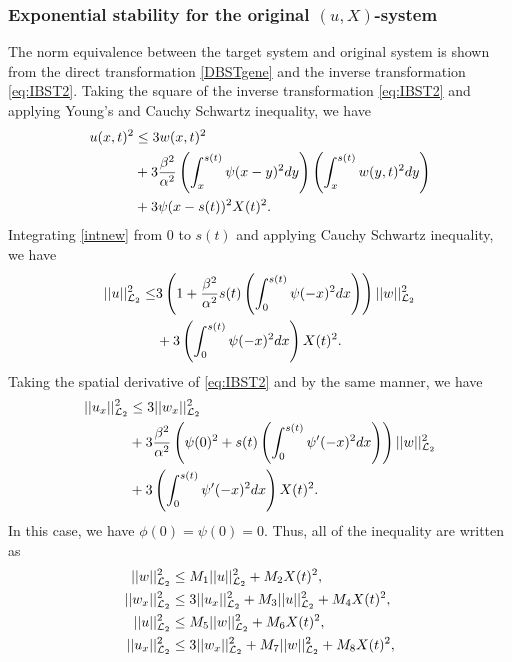 \documentclass[journal]{IEEEtran}
\begin{document}
\subsubsection{Exponential stability for the original $(u, X)$-system}\label{stabilityoriginal}
The norm equivalence between the target system and original system is shown from the direct transformation \eqref{DBSTgene} and the inverse transformation \eqref{eq:IBST2}. Taking the square of the inverse transformation \eqref{eq:IBST2} and applying Young's and Cauchy Schwartz inequality, we have
\begin{align}\label{intnew}
u(x,t)^2 &\leq  3 w(x,t)^2 \notag\\
&+ 3\frac{\beta^2}{\alpha^2} \left( \int_x^{s(t)} \psi(x-y)^2 dy\right) \left( \int_x^{s(t)} w(y,t)^2 dy\right)\notag\\
&+ 3 \psi(x-s(t))^2 X(t)^2.
\end{align}
Integrating \eqref{intnew} from $0$ to $s(t)$ and applying Cauchy Schwartz inequality, we have
\begin{align}\label{app-u-1}
|| u||_{{\cal L}_2}^2  \leq&  3\left(1+\frac{\beta^2}{\alpha^2} s(t) \left( \int_{0}^{s(t)} \psi(-x)^2 dx\right)\right) ||  w ||_{{\cal L}_2}^2 \notag\\
&+ 3 \left( \int_{0}^{s(t)} \psi(-x)^2 dx \right) X(t)^2.
\end{align}
Taking the spatial derivative of \eqref{eq:IBST2} and by the same manner, we have 
\begin{align}
|| u_{x} ||_{{\cal L}_2}^2 &\leq 3 || w_{x} ||_{{\cal L}_2}^2\notag\\
&+  3\frac{\beta^2}{\alpha^2}  \left(\psi(0)^2+s(t) \left( \int_{0}^{s(t)} \psi'(-x)^2 dx\right)\right) || w ||_{{\cal L}_2}^2 \notag\\
&+ 3 \left( \int_{0}^{s(t)} \psi'(-x)^2 dx \right) X(t)^2. 
\end{align}
In this case, we have $\phi(0) = \psi(0) = 0$. Thus, all of the inequality are written as
\begin{align}\label{bound1}
||w||_{{\cal L}_2}^2 &\leq  M_1 ||u||_{{\cal L}_2}^2 +M_2 X(t)^2,\\
\label{bound2}||w_{x}||_{{\cal L}_2}^2 &\leq 3  ||u_{x}||_{{\cal L}_2}^2+ M_3 ||u||_{{\cal L}_2}^2 + M_4X(t)^2,\\
\label{bound3}||u||_{{\cal L}_2}^2  &\leq  M_5 ||w||_{{\cal L}_2}^2 + M_6 X(t)^2,\\
\label{bound4}||u_{x}||_{{\cal L}_2}^2 &\leq 3  ||w_{x}||_{{\cal L}_2}^2+  M_7 ||w||_{{\cal L}_2}^2 + M_8 X(t)^2, 
\end{align}
\end{document}
